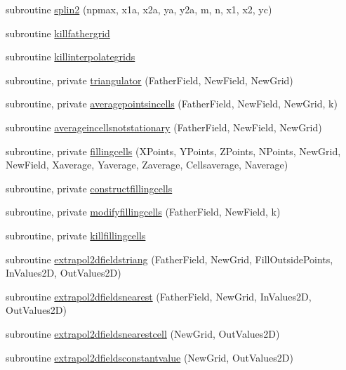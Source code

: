 \begin{DoxyCompactItemize}
subroutine \mbox{\hyperlink{namespacemoduleinterpolategrids_a3af6dc367d6a4dfa5e4250dcb85ab37f}{splin2}} (npmax, x1a, x2a, ya, y2a, m, n, x1, x2, yc)
\item 
subroutine \mbox{\hyperlink{namespacemoduleinterpolategrids_a697db5b73722dba5d0ff54b8ac62f66a}{killfathergrid}}
\item 
subroutine \mbox{\hyperlink{namespacemoduleinterpolategrids_a99be0febe139538023f622ad08cd5770}{killinterpolategrids}}
\item 
subroutine, private \mbox{\hyperlink{namespacemoduleinterpolategrids_aab05b158a6c1a5ca9b834b44a96bed51}{triangulator}} (Father\+Field, New\+Field, New\+Grid)
\item 
subroutine, private \mbox{\hyperlink{namespacemoduleinterpolategrids_a88091593ce71c7617aca77912135e4af}{averagepointsincells}} (Father\+Field, New\+Field, New\+Grid, k)
\item 
subroutine \mbox{\hyperlink{namespacemoduleinterpolategrids_a74dfc196d632c6152816d265fcced032}{averageincellsnotstationary}} (Father\+Field, New\+Field, New\+Grid)
\item 
subroutine, private \mbox{\hyperlink{namespacemoduleinterpolategrids_aa49617b962704e0850c47dd72be5a154}{fillingcells}} (X\+Points, Y\+Points, Z\+Points, N\+Points, New\+Grid, New\+Field, Xaverage, Yaverage, Zaverage, Cellsaverage, Naverage)
\item 
subroutine, private \mbox{\hyperlink{namespacemoduleinterpolategrids_a3df578fd05d6020ac889661230172322}{constructfillingcells}}
\item 
subroutine, private \mbox{\hyperlink{namespacemoduleinterpolategrids_aef67e9e027ab07c151745060a6b0e649}{modifyfillingcells}} (Father\+Field, New\+Field, k)
\item 
subroutine, private \mbox{\hyperlink{namespacemoduleinterpolategrids_ab2c9728a897c55e3db86eb34edf09800}{killfillingcells}}
\item 
subroutine \mbox{\hyperlink{namespacemoduleinterpolategrids_a20223d63f36c638cc63f14868772d148}{extrapol2dfieldstriang}} (Father\+Field, New\+Grid, Fill\+Outside\+Points, In\+Values2D, Out\+Values2D)
\item 
subroutine \mbox{\hyperlink{namespacemoduleinterpolategrids_a6f499d806252d62f33788a8d02639319}{extrapol2dfieldsnearest}} (Father\+Field, New\+Grid, In\+Values2D, Out\+Values2D)
\item 
subroutine \mbox{\hyperlink{namespacemoduleinterpolategrids_a8b539cd3b43a2490e5eb54aee6abf1d0}{extrapol2dfieldsnearestcell}} (New\+Grid, Out\+Values2D)
\item 
subroutine \mbox{\hyperlink{namespacemoduleinterpolategrids_a57274a0561d59adfc89dec77051df3e4}{extrapol2dfieldsconstantvalue}} (New\+Grid, Out\+Values2D)
\end{DoxyCompactItemize}

